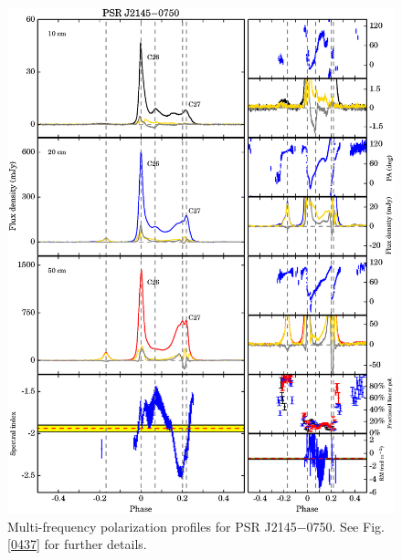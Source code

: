 \documentclass[useAMS,usenatbib]{mn2e}
\begin{document}
\begin{appendix}
\begin{figure}
\begin{center}
\includegraphics[width=6 in]{2145.ps}
\caption{Multi-frequency polarization profiles for PSR J2145$-$0750. 
See Fig. \ref{0437} for further details.}
\label{2145}
\end{center}
\end{figure}


\end{appendix}
\end{document}
